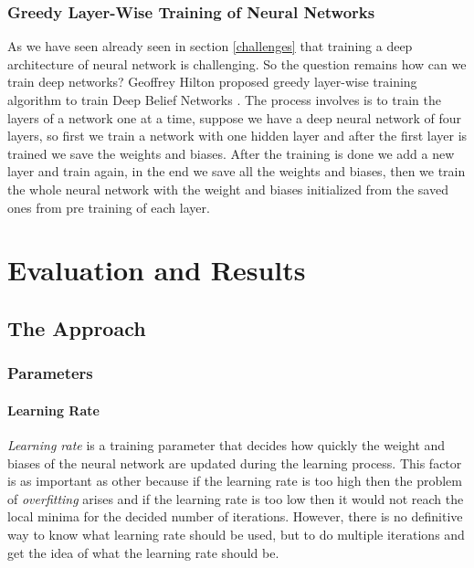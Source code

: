 \documentclass[12pt, a4paper]{report}
\begin{document}
\subsection{Greedy Layer-Wise Training of Neural Networks}\label{greedy}
As we have seen already seen in section \ref{challenges} that training a deep architecture of neural network is challenging. So the question remains how can we train deep networks? Geoffrey Hilton proposed greedy layer-wise training algorithm to train Deep Belief Networks \cite{Greedy}. The process involves is to train the layers of a network one at a time, suppose we have a deep neural network of four layers, so first we train a network with one hidden layer and after the first layer is trained we save the weights and biases. After the training is done we add a new layer and train again, in the end we save all the weights and biases, then we train the whole neural network with the weight and biases initialized from the saved ones from pre training of each layer.\\ \par




\clearpage

\chapter{Evaluation and Results}\label{sec:EvaluationAndResults}
\section{The Approach}\label{approach}

\subsection{Parameters}
\subsubsection{Learning Rate}
\textit{Learning rate} is a training parameter that decides how quickly the weight and biases of the neural network are updated during the learning process. This factor is as important as other because if the learning rate is too high then the problem of \textit{overfitting} arises and if the learning rate is too low then it would not reach the local minima for the decided number of iterations. However, there is no definitive way to know what learning rate should be used, but to do multiple iterations and get the idea of what the learning rate should be.\\
\end{document}
